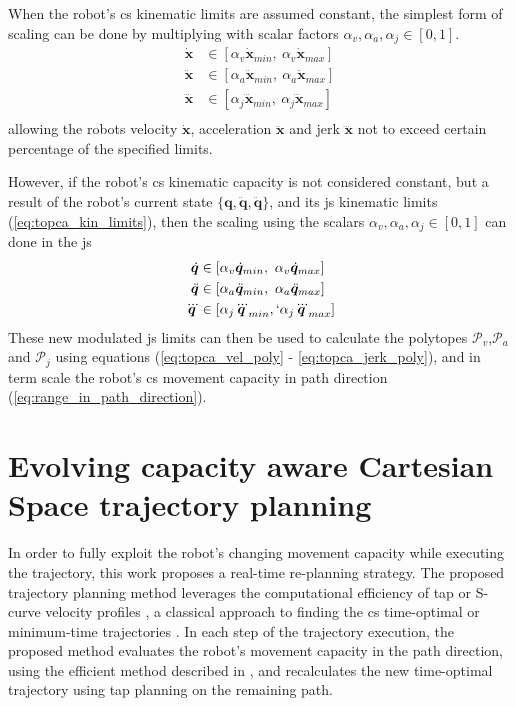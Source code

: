 When the robot's \gls{cs} kinematic limits are assumed constant, the simplest form of scaling can be done by multiplying with scalar factors $\alpha_v,\alpha_a,\alpha_j\in[0,1]$.
\begin{equation}
\begin{split}
\dot{\bm{x}}&\in  [\alpha_v\dot{\bm{x}}_{min},~\alpha_v\dot{\bm{x}}_{max}] \\
\ddot{\bm{x}}&\in  [\alpha_a\ddot{\bm{x}}_{min},~\alpha_a\ddot{\bm{x}}_{max}] \\
\dddot{\bm{x}}&\in  [\alpha_j\dddot{\bm{x}}_{min},~\alpha_j\dddot{\bm{x}}_{max}] \\
 \end{split} \label{eq:limits_cs_alpha}
\end{equation}
allowing the robots velocity $\dot{\bm{x}}$, acceleration $\ddot{\bm{x}}$ and jerk $\dddot{\bm{x}}$ not to exceed certain percentage of the specified limits. 

However, if the robot's \gls{cs} kinematic capacity is not considered constant, but a result of the robot's current state $\{\bm{q},\ddot{\bm{q}},\ddot{\bm{q}}\}$, and its \gls{js} kinematic limits (\ref{eq:topca_kin_limits}), then the scaling using the scalars $\alpha_v,\alpha_a,\alpha_j\in[0,1]$ can done in the \gls{js}
\begin{equation}
\begin{split}
\dot{\bm{q}}&\in  [\alpha_v\dot{\bm{q}}_{min},~\alpha_v\dot{\bm{q}}_{max}] \\
\ddot{\bm{q}}&\in  [\alpha_a\ddot{\bm{q}}_{min},~\alpha_a\ddot{\bm{q}}_{max}] \\
\dddot{\bm{q}}&\in  [\alpha_j\dddot{\bm{q}}_{min},`\alpha_j\dddot{\bm{q}}_{max}] \\
 \end{split} \label{eq:limits_js_alpha}
\end{equation}
These new modulated \gls{js} limits can then be used to calculate the polytopes $\mathcal{P}_v$,$\mathcal{P}_a$ and $\mathcal{P}_j$ using equations (\ref{eq:topca_vel_poly} - \ref{eq:topca_jerk_poly}), and in term scale the robot's \gls{cs} movement capacity in path direction (\ref{eq:range_in_path_direction}). 

\section{Evolving capacity aware Cartesian Space trajectory planning}
\label{ch:tap}


In order to fully exploit the robot's changing movement capacity while executing the trajectory, this work proposes a real-time re-planning strategy.
The proposed trajectory planning method leverages the computational efficiency of \gls{tap} or S-curve velocity profiles \cite[Chapter 9.2.2.2]{modernrobotics}\cite{scurve,ruckig}, a classical approach to finding the \gls{cs} time-optimal or minimum-time trajectories \cite{Gasparetto2012}. 
In each step of the trajectory execution, the proposed method evaluates the robot's movement capacity in the path direction, using the efficient method described in , and recalculates the new time-optimal trajectory using \gls{tap} planning on the remaining path. 


